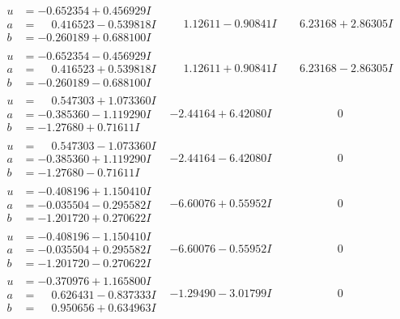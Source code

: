 \documentclass[1p]{elsarticle_modified}
\theoremstyle{definition}
\begin{document}
$$\begin{array}{c|c|c}
\begin{aligned}
u &= -0.652354 + 0.456929 I \\
a &= \phantom{-}0.416523 - 0.539818 I \\
b &= -0.260189 + 0.688100 I\end{aligned}
 & \phantom{-}1.12611 - 0.90841 I & \phantom{-}6.23168 + 2.86305 I \\ \hline\begin{aligned}
u &= -0.652354 - 0.456929 I \\
a &= \phantom{-}0.416523 + 0.539818 I \\
b &= -0.260189 - 0.688100 I\end{aligned}
 & \phantom{-}1.12611 + 0.90841 I & \phantom{-}6.23168 - 2.86305 I \\ \hline\begin{aligned}
u &= \phantom{-}0.547303 + 1.073360 I \\
a &= -0.385360 - 1.119290 I \\
b &= -1.27680 + 0.71611 I\end{aligned}
 & -2.44164 + 6.42080 I & \phantom{-0.000000 } 0 \\ \hline\begin{aligned}
u &= \phantom{-}0.547303 - 1.073360 I \\
a &= -0.385360 + 1.119290 I \\
b &= -1.27680 - 0.71611 I\end{aligned}
 & -2.44164 - 6.42080 I & \phantom{-0.000000 } 0 \\ \hline\begin{aligned}
u &= -0.408196 + 1.150410 I \\
a &= -0.035504 - 0.295582 I \\
b &= -1.201720 + 0.270622 I\end{aligned}
 & -6.60076 + 0.55952 I & \phantom{-0.000000 } 0 \\ \hline\begin{aligned}
u &= -0.408196 - 1.150410 I \\
a &= -0.035504 + 0.295582 I \\
b &= -1.201720 - 0.270622 I\end{aligned}
 & -6.60076 - 0.55952 I & \phantom{-0.000000 } 0 \\ \hline\begin{aligned}
u &= -0.370976 + 1.165800 I \\
a &= \phantom{-}0.626431 - 0.837333 I \\
b &= \phantom{-}0.950656 + 0.634963 I\end{aligned}
 & -1.29490 - 3.01799 I & \phantom{-0.000000 } 0 \\ \hline\begin{aligned}

\end{aligned}
\end{array}$$
\end{document}
